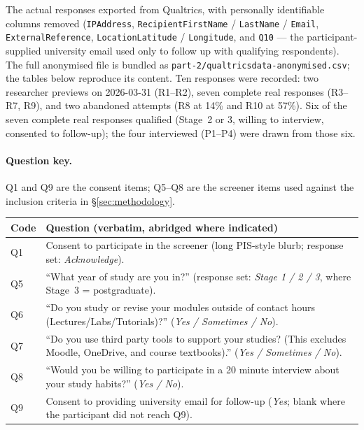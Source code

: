 \documentclass[a4paper,11pt]{article}
\begin{document}
The actual responses exported from Qualtrics, with personally
identifiable columns removed (\texttt{IPAddress},
\texttt{RecipientFirstName} / \texttt{LastName} /
\texttt{Email}, \texttt{ExternalReference},
\texttt{LocationLatitude} / \texttt{Longitude}, and \texttt{Q10} ---
the participant-supplied university email used only to follow up with
qualifying respondents). The full anonymised file is bundled as
\texttt{part-2/qualtricsdata-anonymised.csv}; the tables below
reproduce its content. Ten responses were recorded: two researcher
previews on 2026-03-31 (R1--R2), seven complete real responses
(R3--R7, R9), and two abandoned attempts (R8 at 14\% and R10 at
57\%). Six of the seven complete real responses qualified (Stage~2
or 3, willing to interview, consented to follow-up); the four
interviewed (P1--P4) were drawn from those six.

\paragraph{Question key.} Q1 and Q9 are the consent items; Q5--Q8
are the screener items used against the inclusion criteria in
\S\ref{sec:methodology}.

\begingroup
\setlength{\tabcolsep}{4pt}
\renewcommand{\arraystretch}{1.15}
\begin{longtable}{@{}>{\raggedright\arraybackslash}p{1.0cm}
                    >{\raggedright\arraybackslash}p{14.6cm}@{}}
\toprule
\textbf{Code} & \textbf{Question (verbatim, abridged where indicated)} \\
\midrule
\endhead
Q1 & Consent to participate in the screener (long PIS-style blurb;
     response set: \emph{Acknowledge}). \\
Q5 & ``What year of study are you in?'' (response set: \emph{Stage 1
     / 2 / 3}, where Stage~3 = postgraduate). \\
Q6 & ``Do you study or revise your modules outside of contact hours
     (Lectures/Labs/Tutorials)?'' (\emph{Yes / Sometimes / No}). \\
Q7 & ``Do you use third party tools to support your studies? (This
     excludes Moodle, OneDrive, and course textbooks).'' (\emph{Yes /
     Sometimes / No}). \\
Q8 & ``Would you be willing to participate in a 20 minute interview
     about your study habits?'' (\emph{Yes / No}). \\
Q9 & Consent to providing university email for follow-up
     (\emph{Yes}; blank where the participant did not reach Q9). \\
\bottomrule
\end{longtable}
\endgroup
\end{document}
